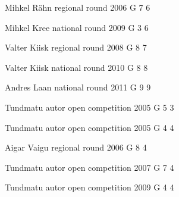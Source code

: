 \documentclass[11pt]{article}
\begin{document}
\ylDisplay{} %
{Mihkel Rähn} %
{regional round} %
{2006} %
{G 7} %
{6} %
{

\ifEngSolution
\fi
}

\ylDisplay{} %
{Mihkel Kree} %
{national round} %
{2009} %
{G 3} %
{6} %
{

\ifEngSolution
\fi
}

\ylDisplay{} %
{Valter Kiisk} %
{regional round} %
{2008} %
{G 8} %
{7} %
{

\ifEngSolution
\fi
}

\ylDisplay{} %
{Valter Kiisk} %
{national round} %
{2010} %
{G 8} %
{8} %
{

\ifEngSolution
\fi
}

\ylDisplay{} %
{Andres Laan} %
{national round} %
{2011} %
{G 9} %
{9} %
{

\ifEngSolution
\fi
}

\ylDisplay{} %
{Tundmatu autor} %
{open competition} %
{2005} %
{G 5} %
{3} %
{

\ifEngSolution
\fi
}

\ylDisplay{} %
{Tundmatu autor} %
{open competition} %
{2005} %
{G 4} %
{4} %
{

\ifEngSolution
\fi
}

\ylDisplay{} %
{Aigar Vaigu} %
{regional round} %
{2006} %
{G 8} %
{4} %
{

\ifEngSolution
\fi
}

\ylDisplay{} %
{Tundmatu autor} %
{open competition} %
{2007} %
{G 7} %
{4} %
{

\ifEngSolution
\fi
}

\ylDisplay{} %
{Tundmatu autor} %
{open competition} %
{2009} %
{G 4} %
{4} %
{

\ifEngSolution
\fi
}
\end{document}
